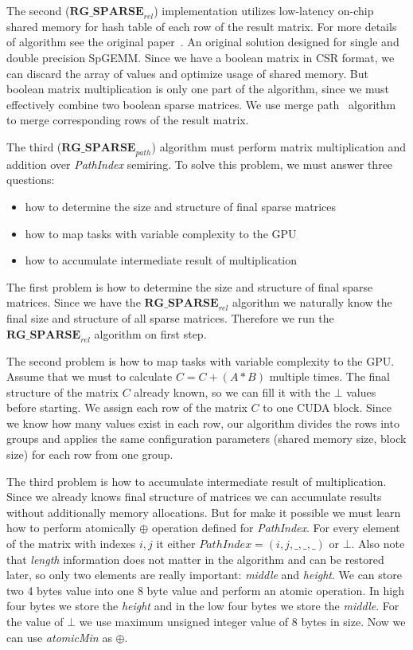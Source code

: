 The second ($\textbf{RG\_SPARSE}_{rel}$) implementation utilizes low-latency on-chip shared memory for hash table of each row of the result matrix. For more details of algorithm see the original paper~\cite{NsparsePaper}. An original solution designed for single and double precision SpGEMM. Since we have a boolean matrix in CSR format, we can discard the array of values and optimize usage of shared memory. But boolean matrix multiplication is only one part of the algorithm, since we must effectively combine two boolean sparse matrices. We use merge path~\cite{GpuMergePathPaper} algorithm to merge corresponding rows of the result matrix.

The third ($\textbf{RG\_SPARSE}_{path}$) algorithm must perform matrix multiplication and addition over \textit{PathIndex} semiring. To solve this problem, we must answer three questions: 

\begin{itemize}
  \item how to determine the size and structure of final sparse matrices
  \item how to map tasks with variable complexity to the GPU
  \item how to accumulate intermediate result of multiplication
\end{itemize}

The first problem is how to determine the size and structure of final sparse matrices. Since we have the $\textbf{RG\_SPARSE}_{rel}$ algorithm we naturally know the final size and structure of all sparse matrices. Therefore we run the $\textbf{RG\_SPARSE}_{rel}$ algorithm on first step.

The second problem is how to map tasks with variable complexity to the GPU. Assume that we must to calculate $C = C + (A * B)$ multiple times. The final structure of the matrix $C$ already known, so we can fill it with the $\bot$ values before starting. We assign each row of the matrix $C$ to one CUDA block. Since we know how many values exist in each row, our algorithm divides the rows into groups and applies the same configuration parameters (shared memory size, block size) for each row from one group.
 
The third problem is how to accumulate intermediate result of multiplication. Since we already knows final structure of matrices we can accumulate results without additionally memory allocations. But for make it possible we must learn how to perform atomically $\oplus$ operation defined for \textit{PathIndex}. For every element of the matrix with indexes $i,j$ it either $PathIndex = (i,j,\_,\_,\_)$ or $\bot$. Also note that \textit{length} information does not matter in the algorithm and can be restored later, so only two elements are really important: \textit{middle} and \textit{height}. We can store two 4 bytes value into one 8 byte value and perform an atomic operation. In high four bytes we store the \textit{height} and in the low four bytes we store the \textit{middle}. For the value of $\bot$ we use maximum unsigned integer value of 8 bytes in size. Now we can use \textit{atomicMin} as $\oplus$.

